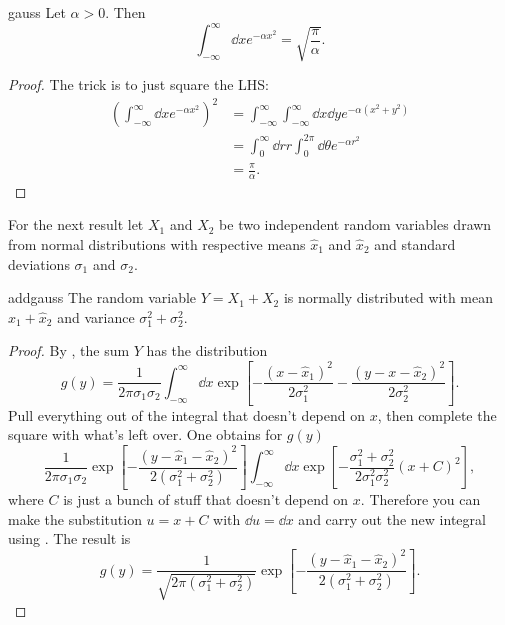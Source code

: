 \begin{proposition}{}{gauss}
  Let $\alpha>0$. Then
  \begin{equation*}
    \int_{-\infty}^\infty\dd{x}e^{-\alpha x^2}=\sqrt{\frac{\pi}{\alpha}}.
  \end{equation*}
  \begin{proof}
    The trick is to just square the LHS:
    \begin{equation*}\begin{aligned}
      \left(\int_{-\infty}^\infty\dd{x}e^{-\alpha x^2}\right)^2
      &=\int_{-\infty}^\infty\int_{-\infty}^\infty\dd{x}\dd{y}
        e^{-\alpha(x^2+y^2)}\\
      &=\int_0^\infty \dd{r}r\int_0^{2\pi}\dd{\theta}e^{-\alpha r^2}\\
      &=\frac{\pi}{\alpha}.
    \end{aligned}\end{equation*}
  \end{proof}
\end{proposition}

For the next result 
let $X_1$ and $X_2$ be two independent random variables drawn from normal
distributions with respective means $\hat{x}_1$ and $\hat{x}_2$ and
standard deviations $\sigma_1$ and $\sigma_2$. 
\begin{proposition}{}{addgauss}
  The random variable $Y=X_1+X_2$ is normally distributed with mean
  $\hat{x}_1+\hat{x}_2$ and variance $\sigma_1^2+\sigma_2^2$.
  \begin{proof}
    By , the sum $Y$ has the distribution
    \begin{equation*}
      g(y)=\frac{1}{2\pi\sigma_1\sigma_2}
           \int_{-\infty}^\infty\dd{x}\exp\left[
             -\frac{(x-\hat{x}_1)^2}{2\sigma_1^2}
             -\frac{(y-x-\hat{x}_2)^2}{2\sigma_2^2}\right].
    \end{equation*}
    Pull everything out of the integral that doesn't depend on $x$,
    then complete the square with what's left over.
    One obtains for $g(y)$
    $$
      \frac{1}{2\pi\sigma_1\sigma_2}
           \exp\left[-\frac{(y-\hat{x}_1-\hat{x}_2)^2}
                      {2(\sigma_1^2+\sigma_2^2)}\right]
           \int_{-\infty}^\infty\dd{x}
           \exp\left[-\frac{\sigma_1^2+\sigma_2^2}
                     {2\sigma_1^2\sigma_2^2}(x+C)^2\right],
    $$
    where $C$ is just a bunch of stuff that doesn't depend on $x$.
    Therefore you can make the substitution $u=x+C$ with $\dd u=\dd x$ and
    carry out the new integral using .
    The result is
    \begin{equation*}
      g(y)=\frac{1}{\sqrt{2\pi(\sigma_1^2+\sigma_2^2)}}
           \exp\left[-\frac{(y-\hat{x}_1-\hat{x}_2)^2}
                      {2(\sigma_1^2+\sigma_2^2)}\right].
    \end{equation*}
  \end{proof}
\end{proposition}

